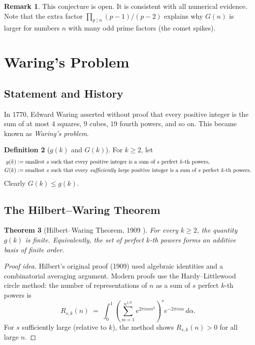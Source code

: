 \documentclass[12pt,a4paper]{amsart}
\newtheorem{theorem}{Theorem}[section]
\theoremstyle{definition}
\newtheorem{definition}[theorem]{Definition}
\newtheorem{remark}[theorem]{Remark}
\begin{document}
\begin{remark}
This conjecture is open.  It is consistent with all numerical evidence.
Note that the extra factor $\prod_{p \mid n} (p-1)/(p-2)$ explains why
$G(n)$ is larger for numbers $n$ with many odd prime factors (the comet
spikes).
\end{remark}

\section{Waring's Problem}\label{sec:waring}

\subsection{Statement and History}

In 1770, Edward Waring asserted without proof that every positive integer
is the sum of at most 4 squares, 9 cubes, 19 fourth powers, and so on.
This became known as \emph{Waring's problem}.

\begin{definition}[$g(k)$ and $G(k)$]
For $k \geq 2$, let
\begin{align*}
  g(k) &:= \text{smallest } s \text{ such that every positive integer is
           a sum of } s \text{ perfect } k\text{-th powers,}\\
  G(k) &:= \text{smallest } s \text{ such that every \emph{sufficiently large}
           positive integer is a sum of } s \text{ perfect } k\text{-th powers.}
\end{align*}
Clearly $G(k) \leq g(k)$.
\end{definition}

\subsection{The Hilbert--Waring Theorem}

\begin{theorem}[Hilbert--Waring Theorem, 1909 \cite{Hilbert1909}]
\label{thm:hilbert-waring}
For every $k \geq 2$, the quantity $g(k)$ is finite.  Equivalently,
the set of perfect $k$-th powers forms an additive basis of finite order.
\end{theorem}

\begin{proof}[Proof idea]
Hilbert's original proof (1909) used algebraic identities and a
combinatorial averaging argument.  Modern proofs use the Hardy--Littlewood
circle method: the number of representations of $n$ as a sum of $s$
perfect $k$-th powers is
\[
  R_{s,k}(n) \;=\; \int_0^1
  \left(\sum_{m=1}^{n^{1/k}} e^{2\pi i \alpha m^k}\right)^s
  e^{-2\pi i n \alpha}\, d\alpha.
\]
For $s$ sufficiently large (relative to $k$), the method shows
$R_{s,k}(n) > 0$ for all large $n$.
\end{proof}
\end{document}
